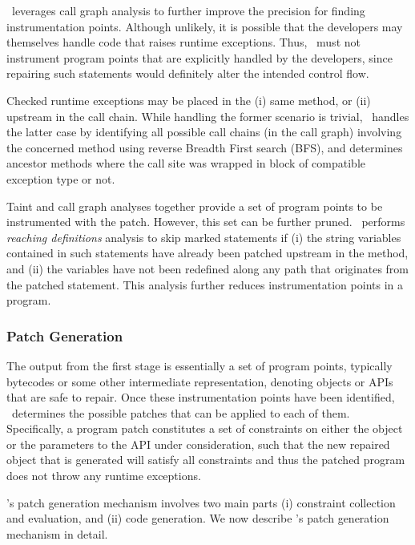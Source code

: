  \tool\ leverages call graph analysis to
further improve the precision for finding instrumentation points. Although
unlikely, it is possible that the developers may themselves handle code that
raises runtime exceptions. Thus, \tool\ must not instrument program points that
are explicitly handled by the developers, since repairing such statements
would definitely alter the intended control flow.

Checked runtime exceptions may be placed in the (i) same method, or (ii)
upstream in the call chain. While handling the former scenario is trivial,
\tool\ handles the latter case by identifying all possible call chains (in
the call graph) involving the concerned method using reverse Breadth First
search (BFS), and determines ancestor methods where the call site was wrapped in
 block of compatible exception type or not.

 Taint and call graph analyses
together provide a set of program points to be instrumented with the
patch. However, this set can be further pruned. \tool\ performs \textit{reaching
definitions} analysis to skip marked statements if
(i) the string variables contained in such statements have already been patched
upstream in the method, and (ii) the variables have not been redefined along any
path that originates from the patched statement. This analysis further reduces
instrumentation points in a program.

\subsubsection{Patch Generation}
\label{sec:tool:stage2}

The output from the first stage is essentially a set of program points,
typically bytecodes or some other intermediate representation, denoting
 objects or APIs that are safe to repair. Once these
instrumentation points have been identified, \tool\ determines the
possible patches that can be applied to each of them. Specifically, a program
patch constitutes a set of constraints on either the  object or the
parameters to the  API under consideration, such that the new
repaired  object that is generated will satisfy all constraints and
thus the patched program does not throw any runtime exceptions.

\tool's patch generation mechanism involves two main parts (i) constraint
collection and evaluation, and (ii) code generation. We now describe \tool's
patch generation mechanism in detail. 

